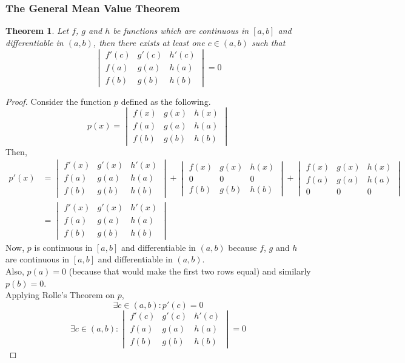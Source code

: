 \documentclass[14]{article}
\newtheorem{theorem}{Theorem}
\theoremstyle{definition}
\begin{document}
\subsubsection{The General Mean Value Theorem}
\begin{theorem}
Let $f$, $g$ and $h$ be functions which are continuous in $[a, b]$ and differentiable in $(a, b)$, then there exists at least one $c \in (a, b)$ such that
\[
\begin{vmatrix}
f'(c) & g'(c) & h'(c)\\
f(a) & g(a) & h(a)\\
f(b) & g(b) & h(b)
\end{vmatrix} = 0
\]
\end{theorem}
\begin{proof}
Consider the function $p$ defined as the following.
\[p(x) = 
\begin{vmatrix}
f(x) & g(x) & h(x)\\
f(a) & g(a) & h(a)\\
f(b) & g(b) & h(b)
\end{vmatrix}
\]
Then,
\begin{align*}
p'(x) &= 
\begin{vmatrix}
f'(x) & g'(x) & h'(x)\\
f(a) & g(a) & h(a)\\
f(b) & g(b) & h(b)
\end{vmatrix}
+
\begin{vmatrix}
f(x) & g(x) & h(x)\\
0 & 0 & 0\\
f(b) & g(b) & h(b)
\end{vmatrix}
+
\begin{vmatrix}
f(x) & g(x) & h(x)\\
f(a) & g(a) & h(a)\\
0 & 0 & 0
\end{vmatrix}\\
&=
\begin{vmatrix}
f'(x) & g'(x) & h'(x)\\
f(a) & g(a) & h(a)\\
f(b) & g(b) & h(b)
\end{vmatrix}
\end{align*}
Now, $p$ is continuous in $[a, b]$ and differentiable in $(a, b)$ because $f$, $g$ and $h$ are continuous in $[a, b]$ and differentiable in $(a, b)$.\\
Also, $p(a) = 0$ (because that would make the first two rows equal) and similarly $p(b) = 0$.\\
Applying Rolle's Theorem on $p$,
\[\exists c \in (a, b) : p'(c) = 0\]
\[\exists c \in (a, b) :
\begin{vmatrix}
f'(c) & g'(c) & h'(c)\\
f(a) & g(a) & h(a)\\
f(b) & g(b) & h(b)
\end{vmatrix} = 0
 \]
\end{proof}
\pagebreak
\end{document}
